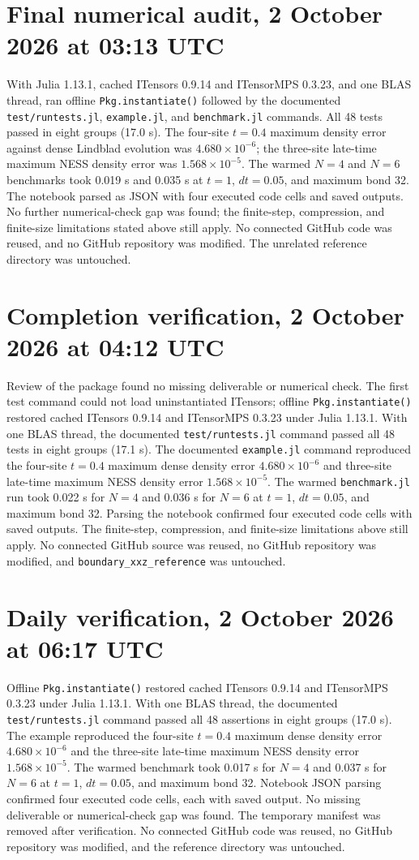 \documentclass[11pt]{article}
\begin{document}
\section*{Final numerical audit, 2 October 2026 at 03:13 UTC}
With Julia 1.13.1,
cached ITensors 0.9.14 and ITensorMPS 0.3.23, and one BLAS thread, ran
offline \texttt{Pkg.instantiate()} followed by the documented
\texttt{test/runtests.jl}, \texttt{example.jl}, and \texttt{benchmark.jl}
commands. All 48 tests passed in eight groups (17.0 s). The four-site
$t=0.4$ maximum density error against dense Lindblad evolution was
$4.680\times10^{-6}$; the three-site late-time maximum NESS density
error was $1.568\times10^{-5}$. The warmed $N=4$ and $N=6$ benchmarks
took 0.019 s and 0.035 s at $t=1$, $dt=0.05$, and maximum bond 32.
The notebook parsed as JSON with four executed code cells and saved outputs.
No further numerical-check gap was found; the finite-step, compression,
and finite-size limitations stated above still apply. No connected GitHub
code was reused, and no GitHub repository was modified. The unrelated
reference directory was untouched.
\section*{Completion verification, 2 October 2026 at 04:12 UTC}
Review of the package found no missing deliverable or numerical check.
The first test command could not load uninstantiated ITensors;
offline \texttt{Pkg.instantiate()} restored cached ITensors 0.9.14 and
ITensorMPS 0.3.23 under Julia 1.13.1. With one BLAS thread, the documented
\texttt{test/runtests.jl} command passed all 48 tests in eight groups
(17.1 s). The documented \texttt{example.jl} command reproduced the
four-site $t=0.4$ maximum dense density error $4.680\times10^{-6}$ and
three-site late-time maximum NESS density error $1.568\times10^{-5}$.
The warmed \texttt{benchmark.jl} run took 0.022 s for $N=4$ and 0.036 s
for $N=6$ at $t=1$, $dt=0.05$, and maximum bond 32. Parsing the notebook
confirmed four executed code cells with saved outputs. The finite-step,
compression, and finite-size limitations above still apply. No connected
GitHub source was reused, no GitHub repository was modified, and
\texttt{boundary\_xxz\_reference} was untouched.
\section*{Daily verification, 2 October 2026 at 06:17 UTC}
Offline
\texttt{Pkg.instantiate()} restored cached ITensors 0.9.14 and
ITensorMPS 0.3.23 under Julia 1.13.1. With one BLAS thread, the
documented \texttt{test/runtests.jl} command passed all 48 assertions
in eight groups (17.0 s). The example reproduced the four-site
$t=0.4$ maximum dense density error $4.680\times10^{-6}$ and the
three-site late-time maximum NESS density error $1.568\times10^{-5}$.
The warmed benchmark took 0.017 s for $N=4$ and 0.037 s for $N=6$
at $t=1$, $dt=0.05$, and maximum bond 32. Notebook JSON parsing
confirmed four executed code cells, each with saved output. No missing
deliverable or numerical-check gap was found. The temporary manifest
was removed after verification. No connected GitHub code was reused,
no GitHub repository was modified, and the reference directory was
untouched.
\end{document}
